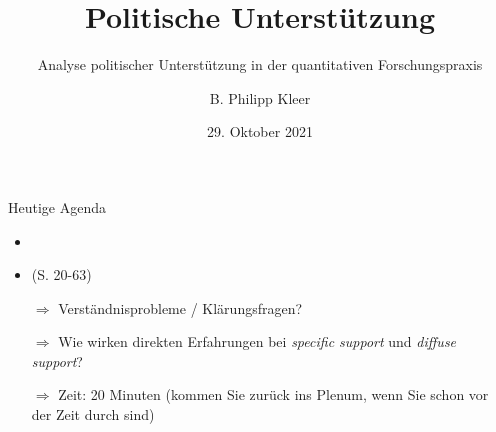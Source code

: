 \documentclass[11pt]{beamer}
\title{Politische Unterstützung}
\subtitle{Analyse politischer Unterstützung in der quantitativen Forschungspraxis}
\date{29. Oktober 2021}
\author{B. Philipp Kleer}
\institute{Institut für Politikwissenschaft | Justus-Liebig-Universität Gießen}
\begin{document}
\begin{frame}
	\maketitle
\end{frame}

\begin{frame}[t]{Heutige Agenda}
	\begin{itemize}
		\item {}
		\item {}  (S. 20-63)
		\item[$\Rightarrow$] Verständnisprobleme / Klärungsfragen?
		\item[$\Rightarrow$] Wie wirken direkten Erfahrungen bei \textit{specific support} und \textit{diffuse support}?
		\item[$\Rightarrow$] Zeit: 20 Minuten (kommen Sie zurück ins Plenum, wenn Sie schon vor der Zeit durch sind)
	\end{itemize}
\end{frame}
\end{document}
